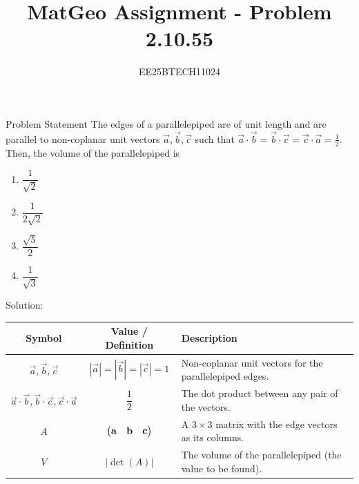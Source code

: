 \documentclass{beamer}
\title{MatGeo Assignment - Problem 2.10.55}
\author{EE25BTECH11024}
\institute{IIT Hyderabad}
\begin{document}
\begin{frame}
  \titlepage
\end{frame}

\begin{frame}{Problem Statement}
The edges of a parallelepiped are of unit length and are parallel to non-coplanar unit vectors $\vec{a}, \vec{b}, \vec{c}$ such that $\vec{a} \cdot \vec{b} = \vec{b} \cdot \vec{c} = \vec{c} \cdot \vec{a} = \frac{1}{2}$. Then, the volume of the parallelepiped is
\begin{enumerate}[label=(\alph*)]
    \item $\dfrac{1}{\sqrt{2}}$
    \item $\dfrac{1}{2\sqrt{2}}$
    \item $\dfrac{\sqrt{5}}{2}$
    \item $\dfrac{1}{\sqrt{3}}$
\end{enumerate}
\end{frame}

\begin{frame}{Solution:}
\noindent
\begin{center}
    \begin{tabular}{|c|c|p{5cm}|}
    \hline
    \textbf{Symbol} & \textbf{Value / Definition} & \textbf{Description}  \\
    \hline
    $\vec{a}, \vec{b}, \vec{c}$ & $|\vec{a}|=|\vec{b}|=|\vec{c}|=1$ & Non-coplanar unit vectors for the parallelepiped edges. \\
    \hline
    $\vec{a}\cdot\vec{b}, \vec{b}\cdot\vec{c}, \vec{c}\cdot\vec{a}$ & $\dfrac{1}{2}$ & The dot product between any pair of the vectors. \\
    \hline
    $A$ & $\begin{pmatrix} \mathbf{a} & \mathbf{b} & \mathbf{c} \end{pmatrix}$ & A $3\times3$ matrix with the edge vectors as its columns. \\
    \hline
    $V$ & $|\det(A)|$ & The volume of the parallelepiped (the value to be found). \\
    \hline
    \end{tabular}
\end{center}
\noindent
\end{frame}
\end{document}

